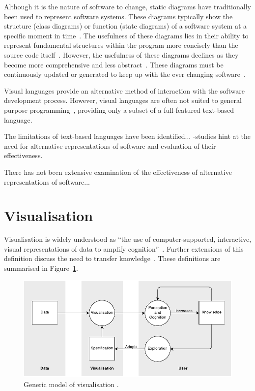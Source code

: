 Although it is the nature of software to change, static diagrams have traditionally been used to represent software systems. These diagrams typically show the structure (class diagrams) or function (state diagrams) of a software system at a specific moment in time~\cite{Rumbaugh2004}. The usefulness of these diagrams lies in their ability to represent fundamental structures within the program more concisely than the source code itself~. However, the usefulness of these diagrams declines as they become more comprehensive and less abstract~. These diagrams must be continuously updated or generated to keep up with the ever changing software~.

Visual languages provide an alternative method of interaction with the software development process. However, visual languages are often not suited to general purpose programming~\cite{Myers1989}, providing only a subset of a full-featured text-based language.

The limitations of text-based languages have been identified...
-studies hint at the need for alternative representations of software and evaluation of their effectiveness.

There has not been extensive examination of the effectiveness of alternative representations of software...

\section{Visualisation}

Visualisation is widely understood as ``the use of computer-supported, interactive, visual representations of data to amplify cognition''~\cite{Card1999}. Further extensions of this definition discuss the need to transfer knowledge~\cite{Burkhard}. These definitions are summarised in Figure~\ref{fig:model-of-visualisation}.

\begin{figure}
  \centering \includegraphics[width=\columnwidth]{../images/diagrams/wijk-model-of-visualisation.pdf}
  \caption{Generic model of visualisation \protect\cite{VanWijk2005}.}
\label{fig:model-of-visualisation}
\end{figure} 

